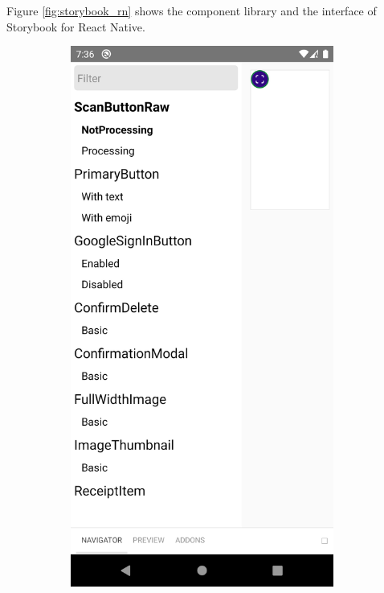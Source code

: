 \documentclass[
  digital, %
  table,   %
  oneside, %
  lof,     %
  lot,     %
]{fithesis3}
\newcommand\half{0.45}
\newcommand\subfigsize{0.95}
\begin{document}
Figure \ref{fig:storybook_rn} shows the component library and the interface of Storybook for React Native.

\begin{figure}
    \centering
    \begin{subfigure}[t]{\half\textwidth}
      \centering
      \includegraphics[width=\subfigsize\textwidth]{figures/other/storybook_rn_menu}

\end{subfigure}
\end{figure}
\end{document}
